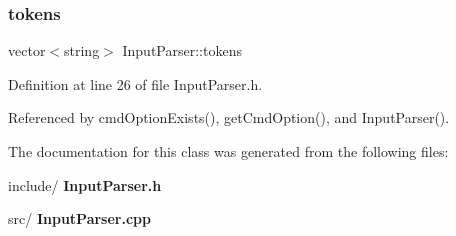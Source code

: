 \subsubsection{tokens}
{\footnotesize\ttfamily vector$<$string$>$ Input\+Parser\+::tokens\hspace{0.3cm}{\ttfamily [private]}}



Definition at line 26 of file Input\+Parser.\+h.



Referenced by cmd\+Option\+Exists(), get\+Cmd\+Option(), and Input\+Parser().



The documentation for this class was generated from the following files\+:\begin{DoxyCompactItemize}
\item 
include/\textbf{ Input\+Parser.\+h}\item 
src/\textbf{ Input\+Parser.\+cpp}\end{DoxyCompactItemize}
